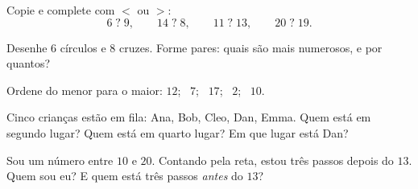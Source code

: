 \begin{exercise}[$\star$]\label{exo:g1:counting:5}
Copie e complete com $<$ ou $>$:
\[
6 \;?\; 9, \qquad
14 \;?\; 8, \qquad
11 \;?\; 13, \qquad
20 \;?\; 19 .
\]
\end{exercise}

\begin{exercise}[$\star$]\label{exo:g1:counting:6}
Desenhe $6$ círculos e $8$ cruzes. Forme pares: quais são mais
numerosos, e por quantos?
\end{exercise}

\begin{exercise}[$\star$]\label{exo:g1:counting:7}
Ordene do menor para o maior: $12$; \ $7$; \ $17$; \ $2$; \ $10$.
\end{exercise}

\begin{exercise}[$\star$]\label{exo:g1:counting:8}
Cinco crianças estão em fila: Ana, Bob, Cleo, Dan, Emma. Quem está
em segundo lugar? Quem está em quarto lugar? Em que lugar está Dan?
\end{exercise}

\begin{exercise}[$\star\star$]\label{exo:g1:counting:9}
Sou um número entre $10$ e $20$. Contando pela reta, estou três
passos depois do $13$. Quem sou eu? E quem está três passos
\emph{antes} do $13$?
\end{exercise}
